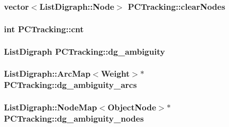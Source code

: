\hypertarget{class_p_c_tracking_a1d232ae428087d499e6696dfa17ed285}{
\subsubsection[{clear\-Nodes}]{\setlength{\rightskip}{0pt plus 5cm}vector$<$\-List\-Digraph\-::\-Node$>$ {\bf \-P\-C\-Tracking\-::clear\-Nodes}}}\label{class_p_c_tracking_a1d232ae428087d499e6696dfa17ed285}
\hypertarget{class_p_c_tracking_aa642907555b7fad809a938b70bd06d8e}{
\subsubsection[{cnt}]{\setlength{\rightskip}{0pt plus 5cm}int {\bf \-P\-C\-Tracking\-::cnt}}}\label{class_p_c_tracking_aa642907555b7fad809a938b70bd06d8e}
\hypertarget{class_p_c_tracking_afd47ea4d5013475b7556ebbc2eacb8a4}{
\subsubsection[{dg\-\_\-ambiguity}]{\setlength{\rightskip}{0pt plus 5cm}\-List\-Digraph {\bf \-P\-C\-Tracking\-::dg\-\_\-ambiguity}}}\label{class_p_c_tracking_afd47ea4d5013475b7556ebbc2eacb8a4}
\hypertarget{class_p_c_tracking_a58337c79f8c1bc741c17867147f90132}{
\subsubsection[{dg\-\_\-ambiguity\-\_\-arcs}]{\setlength{\rightskip}{0pt plus 5cm}\-List\-Digraph\-::\-Arc\-Map$<${\bf \-Weight}$>$$\ast$ {\bf \-P\-C\-Tracking\-::dg\-\_\-ambiguity\-\_\-arcs}}}\label{class_p_c_tracking_a58337c79f8c1bc741c17867147f90132}
\hypertarget{class_p_c_tracking_ab0978d139653c88b54b8e0f214ec2e2e}{
\subsubsection[{dg\-\_\-ambiguity\-\_\-nodes}]{\setlength{\rightskip}{0pt plus 5cm}\-List\-Digraph\-::\-Node\-Map$<${\bf \-Object\-Node}$>$$\ast$ {\bf \-P\-C\-Tracking\-::dg\-\_\-ambiguity\-\_\-nodes}}}\label{class_p_c_tracking_ab0978d139653c88b54b8e0f214ec2e2e}
